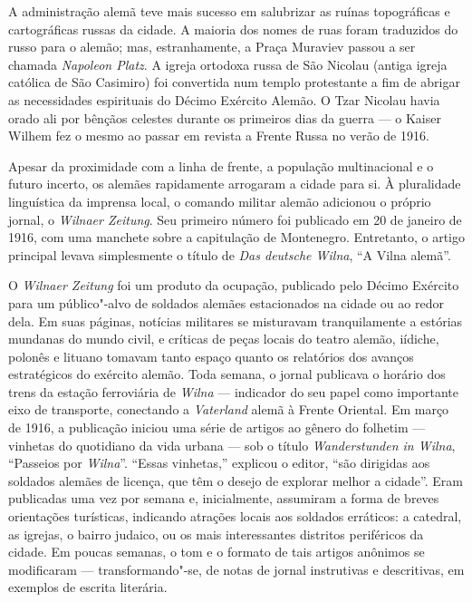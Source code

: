 A administração alemã teve mais sucesso em salubrizar as ruínas
topográficas e cartográficas russas da cidade. A maioria dos nomes de
ruas foram traduzidos do russo para o alemão; mas, estranhamente, a
Praça Muraviev passou a ser chamada \textit{Napoleon Platz}. A igreja
ortodoxa russa de São Nicolau (antiga igreja católica de São Casimiro)
foi convertida num templo protestante a fim de abrigar as necessidades
espirituais do Décimo Exército Alemão. O Tzar Nicolau  havia orado ali
por bênçãos celestes durante os primeiros dias da guerra --- o Kaiser
Wilhem  fez o mesmo ao passar em revista a Frente Russa no verão de
1916.

\asterisc

Apesar da proximidade com a linha de frente, a população multinacional e
o futuro incerto, os alemães rapidamente arrogaram a cidade para si. À
pluralidade linguística da imprensa local, o comando militar alemão
adicionou o próprio jornal, o \textit{Wilnaer Zeitung}. Seu primeiro
número foi publicado em 20 de janeiro de 1916, com uma manchete sobre a
capitulação de Montenegro. Entretanto, o artigo principal levava
simplesmente o título de \textit{Das deutsche Wilna}, ``A Vilna alemã''.

O \textit{Wilnaer Zeitung} foi um produto da ocupação, publicado pelo
Décimo Exército para um público"-alvo de soldados alemães estacionados na
cidade ou ao redor dela. Em suas páginas, notícias militares se
misturavam tranquilamente a estórias mundanas do mundo civil, e críticas
de peças locais do teatro alemão, iídiche, polonês e lituano tomavam
tanto espaço quanto os relatórios dos avanços estratégicos do exército
alemão. Toda semana, o jornal publicava o horário dos trens da estação
ferroviária de \textit{Wilna} --- indicador do seu papel como importante eixo de
transporte, conectando a \textit{Vaterland} alemã à Frente Oriental. Em
março de 1916, a publicação iniciou uma série de artigos ao gênero do
folhetim --- vinhetas do quotidiano da vida urbana --- sob o título
\textit{Wanderstunden in Wilna}, ``Passeios por \textit{Wilna}''. ``Essas vinhetas,''
explicou o editor, ``são dirigidas aos soldados alemães de licença, que
têm o desejo de explorar melhor a cidade''. Eram publicadas uma vez por
semana e, inicialmente, assumiram a forma de breves orientações
turísticas, indicando atrações locais aos soldados erráticos: a
catedral, as igrejas, o bairro judaico, ou os mais interessantes
distritos periféricos da cidade. Em poucas semanas, o tom e o formato de
tais artigos anônimos se modificaram --- transformando"-se, de notas de
jornal instrutivas e descritivas, em exemplos de escrita literária.

